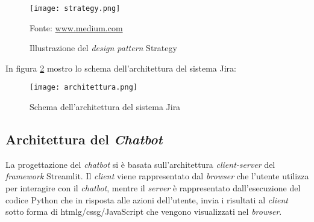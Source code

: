 \begin{figure}[H]
    \centering
    \texttt{[image: strategy.png]}
    \caption{Illustrazione del \textit{design pattern} Strategy}
    \small Fonte: \href{https://medium.com/litslink/design-patterns-strategy-in-examples-eae7bf10a817} {www.medium.com}
    \label{fig:strategy}
\end{figure}

\noindent
In figura \ref{fig:architetturaJira} mostro lo schema dell'architettura del sistema Jira:
\begin{figure}[H]
    \centering
    \texttt{[image: architettura.png]}
    \caption{Schema dell'architettura del sistema Jira}
    \label{fig:architetturaJira}
\end{figure}

\subsection{Architettura del \textit{Chatbot}}
La progettazione del \textit{chatbot} si è basata sull'architettura \textit{client-server} del \textit{framework} Streamlit. Il \textit{client} viene rappresentato dal \textit{browser} che l'utente utilizza per interagire con il \textit{chatbot}, mentre il \textit{server} è rappresentato dall'esecuzione del codice Python che in risposta alle azioni dell'utente, invia i risultati al \textit{client} sotto forma di \gls{htmlg}/\gls{cssg}/JavaScript che vengono visualizzati nel \textit{browser}.
